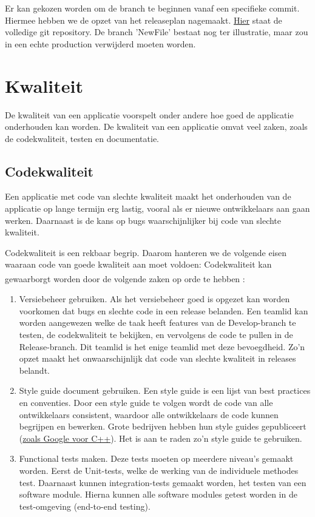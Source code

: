\documentclass[12pt]{article}
\begin{document}
Er kan gekozen worden om de branch te beginnen vanaf een specifieke commit. Hiermee hebben we de opzet van het releaseplan nagemaakt.
\href{https://github.com/kndschilders/ReleasePlanGitTest}{Hier}
staat de volledige git repository. De branch 'NewFile' bestaat nog ter illustratie, maar zou in een echte production verwijderd moeten worden.

\pagebreak
\section{Kwaliteit}
De kwaliteit van een applicatie voorspelt onder andere hoe goed de applicatie onderhouden kan worden. De kwaliteit van een applicatie omvat veel zaken, zoals de codekwaliteit, testen en documentatie.

\subsection{Codekwaliteit}
Een applicatie met code van slechte kwaliteit maakt het onderhouden van de applicatie op lange termijn erg lastig, vooral als er nieuwe ontwikkelaars aan gaan werken. Daarnaast is de kans op bugs waarschijnlijker bij code van slechte kwaliteit.

Codekwaliteit is een rekbaar begrip. Daarom hanteren we de volgende eisen waaraan code van goede kwaliteit aan moet voldoen:
Codekwaliteit kan gewaarborgt worden door de volgende zaken op orde te hebben \textsuperscript{\cite{code_quality}}:

\begin{enumerate}
	\item Versiebeheer gebruiken. Als het versiebeheer goed is opgezet kan worden voorkomen dat bugs en slechte code in een release belanden. Een teamlid kan worden aangewezen welke de taak heeft features van de Develop-branch te testen, de codekwaliteit te bekijken, en vervolgens de code te pullen in de Release-branch. Dit teamlid is het enige teamlid met deze bevoegdheid. Zo'n opzet maakt het onwaarschijnlijk dat code van slechte kwaliteit in releases belandt.
	\item Style guide document gebruiken. Een style guide is een lijst van best practices en conventies. Door een style guide te volgen wordt de code van alle ontwikkelaars consistent, waardoor alle ontwikkelaars de code kunnen begrijpen en bewerken. Grote bedrijven hebben hun style guides gepubliceert (\href{https://google.github.io/styleguide/cppguide.html}{zoals Google voor C++}). Het is aan te raden zo'n style guide te gebruiken.
	\item Functional tests maken. Deze tests moeten op meerdere niveau's gemaakt worden. Eerst de Unit-tests, welke de werking van de individuele methodes test. Daarnaast kunnen integration-tests gemaakt worden, het testen van een software module. Hierna kunnen alle software modules getest worden in de test-omgeving (end-to-end testing).
\end{enumerate}
\end{document}
